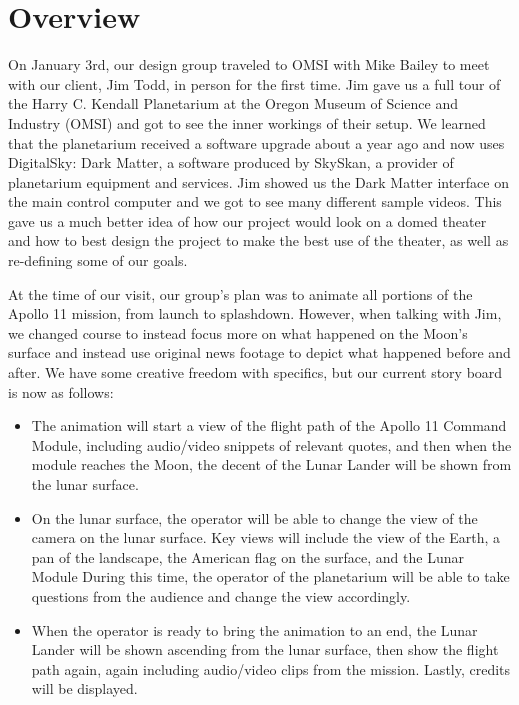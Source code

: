 \documentclass[onecolumn, draftclsnofoot,10pt, compsoc]{IEEEtran}
\begin{document}
\listoffigures
\clearpage

\section{Overview}

On January 3rd, our design group traveled to OMSI with Mike Bailey to meet with our client, Jim Todd, in person for the first time. Jim gave us a full tour of the Harry C. Kendall Planetarium at the Oregon Museum of Science and Industry (OMSI) and got to see the inner workings of their setup. We learned that the planetarium received a software upgrade about a year ago and now uses DigitalSky: Dark Matter, a software produced by SkySkan, a provider of planetarium equipment and services. Jim showed us the Dark Matter interface on the main control computer and we got to see many different sample videos. This gave us a much better idea of how our project would look on a domed theater and how to best design the project to make the best use of the theater, as well as re-defining some of our goals. 

At the time of our visit, our group's plan was to animate all portions of the Apollo 11 mission, from launch to splashdown. However, when talking with Jim, we changed course to instead focus more on what happened on the Moon's surface and instead use original news footage to depict what happened before and after. We have some creative freedom with specifics, but our current story board is now as follows: 

\begin{itemize}
    \item The animation will start a view of the flight path of the Apollo 11 Command Module, including audio/video snippets of relevant quotes, and then when the module reaches the Moon, the decent of the Lunar Lander will be shown from the lunar surface.
    
    \item On the lunar surface, the operator will be able to change the view of the camera on the lunar surface. Key views will include the view of the Earth, a pan of the landscape, the American flag on the surface, and the Lunar Module During this time, the operator of the planetarium will be able to take questions from the audience and change the view accordingly. 
    
    \item When the operator is ready to bring the animation to an end, the Lunar Lander will be shown ascending from the lunar surface, then show the flight path again, again including audio/video clips from the mission. Lastly, credits will be displayed. 
    
\end{itemize}
\end{document}
